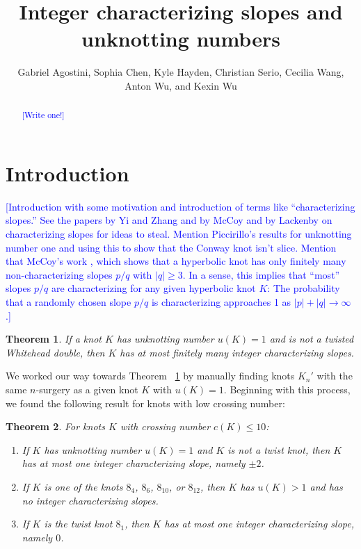 \documentclass[11pt,usenames,dvipsnames,reqno]{amsart}
\newtheorem{theorem}{Theorem}
\numberwithin{theorem}{section}
\theoremstyle{ex}
\theoremstyle{rem}
\def\kh#1{\textcolor{Blue}{#1}}
\begin{document}


\title{Integer characterizing slopes and unknotting numbers}

\author[G. Agostini, S. Chen, K. Hayden, C. Serio, C. Wang, A. Wu, and K. Wu]{Gabriel Agostini, Sophia Chen, Kyle Hayden, Christian Serio, Cecilia Wang, Anton Wu, and Kexin Wu}



\begin{abstract} 
\kh{[Write one!]}
\end{abstract}


\maketitle

\section{Introduction}\label{sec:intro}

\kh{[Introduction with some motivation and introduction of terms like ``characterizing slopes.'' See the papers by Yi and Zhang and by McCoy and by Lackenby on characterizing slopes for ideas to steal. Mention Piccirillo's results for unknotting number one and using this to show that the Conway knot isn't slice. Mention that McCoy's work \cite{mccoy:hyperbolic}, which shows that a hyperbolic knot has only finitely many non-characterizing slopes $p/q$ with $|q| \geq 3$. In a sense, this implies that ``most'' slopes $p/q$ are characterizing for any given hyperbolic knot $K$: The  probability that a randomly chosen slope $p/q$ is characterizing approaches 1 as $|p|+|q|\to \infty$.]}

\begin{theorem}\label{thm:unknotting-one} If a knot $K$ has unknotting number $u(K)=1$ and is not a twisted Whitehead double, then $K$ has at most finitely many integer characterizing slopes.
\end{theorem}

We worked our way towards Theorem ~\ref{thm:unknotting-one} by manually finding knots $K_{n}'$ with the same $n$-surgery as a given knot $K$ with $u(K)=1$. Beginning with this process, we found the following result for knots with low crossing number:

\begin{theorem}\label{thm:low-crossing} For knots $K$ with crossing number $c(K) \leq 10$:
	\begin{enumerate}[label=\normalfont \bf (\alph*)]
		\item If $K$ has unknotting number $u(K)=1$ and $K$ is not a twist knot, then $K$ has at most one integer characterizing slope, namely $\pm 2$.
		\item If $K$ is one of the knots $8_4$, $8_6$, $8_{10}$, or $8_{12}$, then $K$ has $u(K)>1$ and has no integer characterizing slopes.
		\item If $K$ is the twist knot $8_1$, then $K$ has at most one integer characterizing slope, namely $0$.
	\end{enumerate}
\end{theorem}
\end{document}
